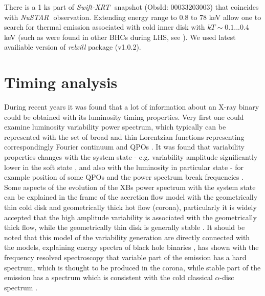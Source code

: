 \documentclass[a4paper,fleqn,usenatbib]{mnras}
\def\swiftx{{\em Swift-XRT\,}}
\def\nustar{{\em NuSTAR\,}}
\begin{document}
There is a 1 ks part of \swiftx\, snapshot (ObsId: 00033203003) that coincides with \nustar\, observation.  Extending energy range to 0.8 to 78 keV allow one to search for thermal emission associated with cold inner disk with $kT \sim 0.1...0.4$ keV (such as were found in other BHCs during LHS, see \cite[][ e.t.c]{miller06b,miller06a,parker15}).
We used latest availiable version of {\it relxill} package (v1.0.2). 



\section{Timing analysis} 

During recent years it was found that a lot of information about an X-ray binary could be obtained with its luminosity timing properties.
Very first one could examine luminosity variability power spectrum, which typically can be represented with the set of broad and thin Lorentzian functions representing correspondingly Fourier continuum and QPOs \citep[see, e.g.][]{1972ApJ...174L..35T, 1990A&A...227L..33B}.
It was found that variability properties changes with the system state - e.g. variability amplitude significantly lower in the soft state \citep{},  and also with the luminosity in particular state - for example position of some QPOs and the power spectrum break frequencies \cite{1990A&A...227L..33B}. 
Some aspects of the evolution of the XBs power spectrum with the system state can be explained in the frame of the accretion flow model with the geometrically thin cold disk and geometrically thick hot flow (corona), particularly it is widely accepted that the high amplitude variability is associated with the geometrically thick flow, while the geometrically thin disk is generally stable \citep{churazov}. 
It should be noted that this model of the variability generation are directly connected with the models, explaining energy spectra of black hole binaries \citep[see, e.g.,][]{1975ApJ...199L.153E, 1976ApJ...204..187S, 1995ApJ...452..710N}, \citet{churazov} has shown with the frequency resolved spectroscopy that variable part of the emission has a hard spectrum, which is thought to be produced in the corona, while stable part of the emission has a spectrum which is consistent with the cold classical $\alpha$-disc spectrum \citep{ss73}.
\end{document}
